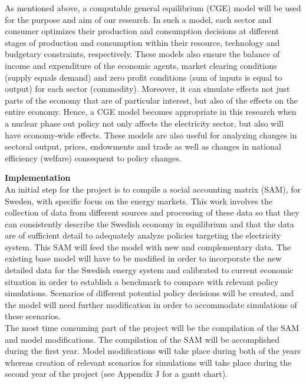 As mentioned above, a computable general equilibrium (CGE) model will be used for the purpose and aim of our research. In such a model, each sector and consumer optimizes their production and consumption decisions at different stages of production and consumption within their resource, technology and budgetary constraints, respectively. These models also ensure the balance of income and expenditure of the economic agents, market clearing conditions (supply equals demand) and zero profit conditions (sum of inputs is equal to output) for each sector (commodity). Moreover, it can simulate effects not just parts of the economy that are of particular interest, but also of the effects on the entire economy. Hence, a CGE model becomes appropriate in this research when a nuclear phase out policy not only affects the electricity sector, but also will have economy-wide effects. These models are also useful for analyzing changes in sectoral output, prices, endowments and trade as well as changes in national efficiency (welfare) consequent to policy changes.\\
\begin{comment}
Hydropower and nuclear power are subject to caps on production, at least in the short or medium term. The growth of hydropower is restricted and the restriction of the capacity of nuclear power is the target for the analysis. These types of capacity constraints are well suited to be modeled under the mixed complementarity framework \citep{raey}, which we will use for our proposed project.\\
\end{comment}
\textbf{Implementation}\\
An initial step for the project is to compile a social accounting matrix (SAM), for Sweden, with specific focus on the energy markets. This work involves the collection of data from different sources and processing of these data so that they can consistently describe the Swedish economy in equilibrium and that the data are of sufficient detail to adequately analyze policies targeting the electricity system. This SAM will feed the model with new and complementary data.
The existing base model will have to be modified in order to incorporate the new detailed data for the Swedish energy system and calibrated to current economic situation in order to establish a benchmark to compare with relevant policy simulations. Scenarios of different potential policy decisions will be created, and the model will need further modification in order to accommodate simulations of these scenarios.\\
The most time consuming part of the project will be the compilation of the SAM and model modifications. The compilation of the SAM will be accomplished during the first year. Model modifications will take place during both of the years whereas creation of relevant scenarios for simulations will take place during the second year of the project (see Appendix J for a gantt chart).\\

